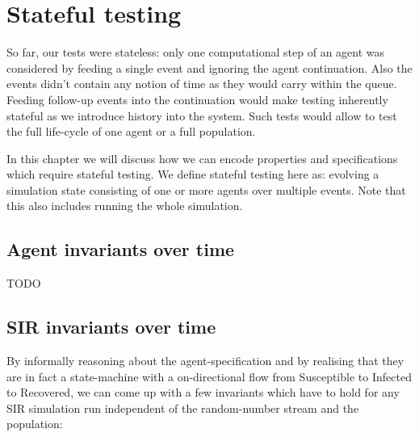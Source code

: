 \chapter{Stateful testing}
\label{ch:stateful_testing}

So far, our tests were stateless: only one computational step of an agent was considered by feeding a single event and ignoring the agent continuation. Also the events didn't contain any notion of time as they would carry within the queue. Feeding follow-up events into the continuation would make testing inherently stateful as we introduce history into the system. Such tests would allow to test the full life-cycle of one  agent or a full population.

In this chapter we will discuss how we can encode properties and specifications which require stateful testing. We define stateful testing here as: evolving a simulation state consisting of one or more agents over multiple events. Note that this also includes running the whole simulation.

\section{Agent invariants over time}
TODO

\section{SIR invariants over time}
By informally reasoning about the agent-specification and by realising that they are in fact a state-machine with a on-directional flow from Susceptible to Infected to Recovered, we can come up with a few invariants which have to hold for any SIR simulation run independent of the random-number stream and the population:

